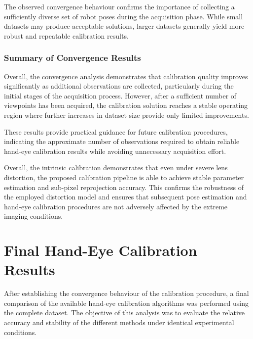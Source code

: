 The observed convergence behaviour confirms the importance of collecting a sufficiently diverse set of robot poses during the acquisition phase. While small datasets may produce acceptable solutions, larger datasets generally yield more robust and repeatable calibration results.



\subsubsection{Summary of Convergence Results}



Overall, the convergence analysis demonstrates that calibration quality improves significantly as additional observations are collected, particularly during the initial stages of the acquisition process. However, after a sufficient number of viewpoints has been acquired, the calibration solution reaches a stable operating region where further increases in dataset size provide only limited improvements.

These results provide practical guidance for future calibration procedures, indicating the approximate number of observations required to obtain reliable hand-eye calibration results while avoiding unnecessary acquisition effort.


Overall, the intrinsic calibration demonstrates that even under severe lens distortion, the proposed calibration pipeline is able to achieve stable parameter estimation and sub-pixel reprojection accuracy. This confirms the robustness of the employed distortion model and ensures that subsequent pose estimation and hand-eye calibration procedures are not adversely affected by the extreme imaging conditions.








\section{Final Hand-Eye Calibration Results}
\label{sec:final_handeye_results}

After establishing the convergence behaviour of the calibration procedure, a final comparison of the available hand-eye calibration algorithms was performed using the complete dataset. The objective of this analysis was to evaluate the relative accuracy and stability of the different methods under identical experimental conditions.

